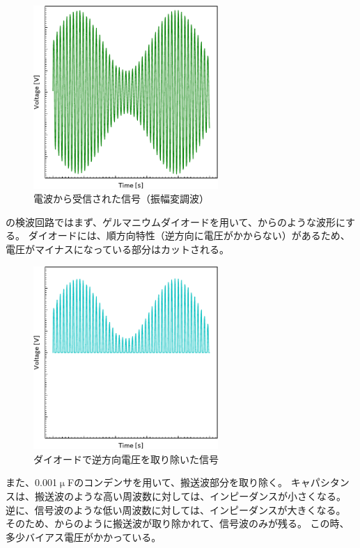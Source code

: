 \documentclass[report.tex]{subfiles}
\begin{document}
\begin{figure}[H]
	\centering
	\includegraphics[width=7cm]{fig/Wave.pdf}
	\caption{電波から受信された信号（振幅変調波）}
	\label{fig:wave}
\end{figure}

の検波回路ではまず、ゲルマニウムダイオードを用いて、からのような波形にする。
ダイオードには、順方向特性（逆方向に電圧がかからない）があるため、電圧がマイナスになっている部分はカットされる\cite{電子回路}。

\begin{figure}[H]
	\centering
	\includegraphics[width=7cm]{fig/diode.pdf}
	\caption{ダイオードで逆方向電圧を取り除いた信号}
	\label{fig:diode}
\end{figure}

また、0.001\(\upmu\)Fのコンデンサを用いて、搬送波部分を取り除く。
キャパシタンスは、搬送波のような高い周波数に対しては、インピーダンスが小さくなる。
逆に、信号波のような低い周波数に対しては、インピーダンスが大きくなる。
そのため、からのように搬送波が取り除かれて、信号波のみが残る。
この時、多少バイアス電圧がかかっている。
\end{document}
